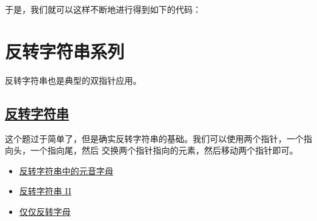 \documentclass[../../main.tex]{subfiles}
\begin{document}
于是，我们就可以这样不断地进行得到如下的代码：



\section{反转字符串系列}

反转字符串也是典型的双指针应用。

\subsection{\href{https://leetcode.cn/problems/reverse-string/}{反转字符串}}

这个题过于简单了，但是确实反转字符串的基础。我们可以使用两个指针，一个指向头，一个指向尾，然后
交换两个指针指向的元素，然后移动两个指针即可。



\begin{kaobox}[title=类似题目]
  \begin{itemize}
    \item \href{https://leetcode.cn/problems/reverse-vowels-of-a-string/}{反转字符串中的元音字母}
    \item \href{https://leetcode.cn/problems/reverse-string-ii/}{反转字符串 II}
    \item \href{https://leetcode.cn/problems/reverse-only-letters/}{仅仅反转字母}
  \end{itemize}
\end{kaobox}
\end{document}
